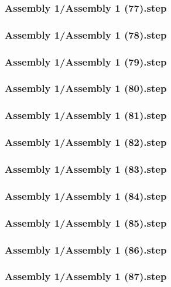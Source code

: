 \documentclass[a4paper,12pt]{article}
\begin{document}
\subsubsection{Assembly 1/Assembly 1 (77).step}

\subsubsection{Assembly 1/Assembly 1 (78).step}

\subsubsection{Assembly 1/Assembly 1 (79).step}

\subsubsection{Assembly 1/Assembly 1 (80).step}

\subsubsection{Assembly 1/Assembly 1 (81).step}

\subsubsection{Assembly 1/Assembly 1 (82).step}

\subsubsection{Assembly 1/Assembly 1 (83).step}

\subsubsection{Assembly 1/Assembly 1 (84).step}

\subsubsection{Assembly 1/Assembly 1 (85).step}

\subsubsection{Assembly 1/Assembly 1 (86).step}

\subsubsection{Assembly 1/Assembly 1 (87).step}

\end{document}
